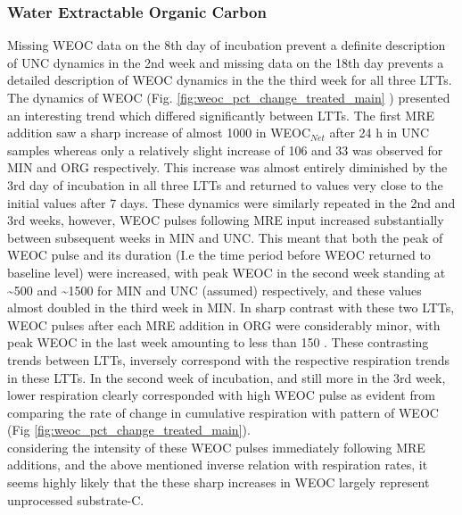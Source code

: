 		\subsubsection{Water Extractable Organic Carbon}

			Missing WEOC data on the 8th day of incubation prevent a definite description of UNC dynamics in the 2nd week and missing data on the 18th day prevents a detailed description of WEOC dynamics in the the third week for all three LTTs. The dynamics of WEOC (Fig. \ref{fig:weoc_pct_change_treated_main} ) presented an interesting trend which differed significantly between LTTs. The first MRE addition saw a sharp increase of almost 1000 \genericunit in WEOC$_{Net}$ after 24 h in UNC samples whereas only a relatively slight increase of 106 and 33 \genericunit was observed for MIN and ORG respectively. This increase was almost entirely diminished by the 3rd day of incubation in all three LTTs and returned to values very close to the initial values after 7 days. These dynamics were similarly repeated in the 2nd and 3rd weeks, however, WEOC pulses following MRE input increased substantially between subsequent weeks in MIN and UNC. This meant that both the peak of WEOC pulse and its duration (I.e the time period before WEOC returned to baseline level) were increased, with peak WEOC in the second week standing at \~{}500 and \~{}1500 \genericunit for MIN and UNC (assumed) respectively, and these values almost doubled in the third week in MIN. In sharp contrast with these two LTTs, WEOC pulses after each MRE addition in ORG were considerably minor, with peak WEOC in the last week amounting to less than 150 \genericunit.
			These contrasting trends between LTTs, inversely correspond with the respective respiration trends in these LTTs. In the second week of incubation, and still more in the 3rd week, lower respiration clearly corresponded with high WEOC pulse as evident from comparing the rate of change in cumulative respiration with pattern of WEOC (Fig \ref{fig:weoc_pct_change_treated_main}).\\
			considering the intensity of these WEOC pulses immediately following MRE additions, and the above mentioned inverse relation with respiration rates, it seems highly likely that the these sharp increases in WEOC largely represent unprocessed substrate-C.
